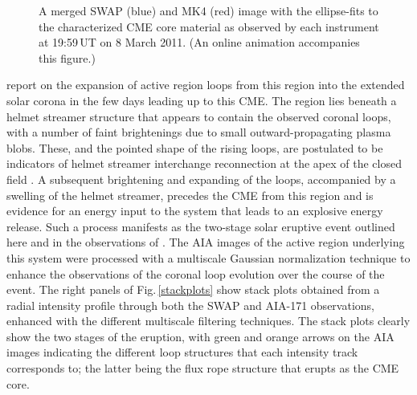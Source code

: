 \documentclass[namedreferences]{solarphysics}
\begin{document}
\begin{article}
\begin{figure}[t]
\caption{A merged SWAP (blue) and MK4 (red) image with the ellipse-fits to the characterized CME core material as observed by each instrument at 19:59\,UT on 8 March 2011. (An online animation accompanies this figure.)}
\label{combined}
\end{figure}

 report on the expansion of active region loops from this region into the extended solar corona in the few days leading up to this CME. The region lies beneath a helmet streamer structure that appears to contain the observed coronal loops, with a number of faint brightenings due to small outward-propagating plasma blobs. These, and the pointed shape of the rising loops, are postulated to be indicators of helmet streamer interchange reconnection at the apex of the closed field \cite{2012ApJ...749..182W}. A subsequent brightening and expanding of the loops, accompanied by a swelling of the helmet streamer, precedes the CME from this region and is evidence for an energy input to the system that leads to an explosive energy release. Such a process manifests as the two-stage solar eruptive event outlined here and in the observations of . The AIA images of the active region underlying this system were processed with a multiscale Gaussian normalization technique \cite{MorganDruckmuller_inreview} to enhance the observations of the coronal loop evolution over the course of the event. The right panels of Fig.\,\ref{stackplots} show stack plots obtained from a radial intensity profile through both the SWAP and AIA-171 observations, enhanced with the different multiscale filtering techniques. The stack plots clearly show the two stages of the eruption, with green and orange arrows on the AIA images indicating the different loop structures that each intensity track corresponds to; the latter being the flux rope structure that erupts as the CME core.


\end{article}
\end{document}
